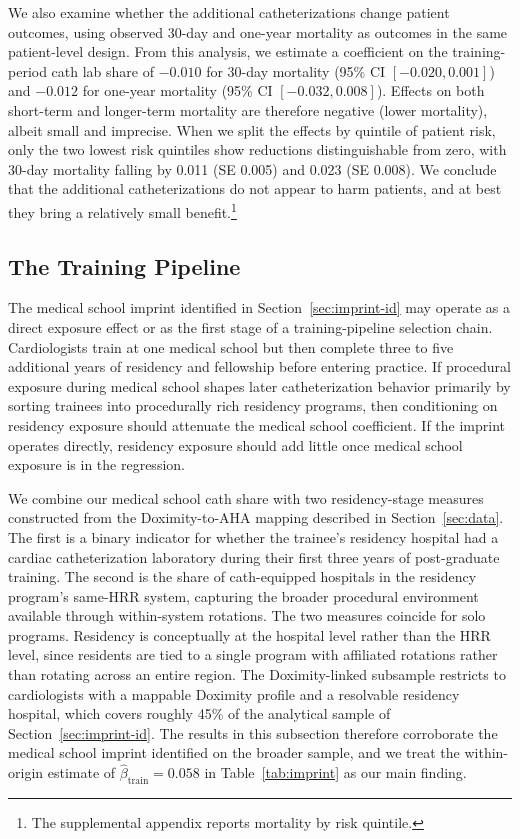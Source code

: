 \documentclass[12pt]{article}
\begin{document}
We also examine whether the additional catheterizations change patient outcomes, using observed 30-day and one-year mortality as outcomes in the same patient-level design. From this analysis, we estimate a coefficient on the training-period cath lab share of $-0.010$ for 30-day mortality (95\% CI $[-0.020, 0.001]$) and $-0.012$ for one-year mortality (95\% CI $[-0.032, 0.008]$). Effects on both short-term and longer-term mortality are therefore negative (lower mortality), albeit small and imprecise. When we split the effects by quintile of patient risk, only the two lowest risk quintiles show reductions distinguishable from zero, with 30-day mortality falling by 0.011 (SE 0.005) and 0.023 (SE 0.008). We conclude that the additional catheterizations do not appear to harm patients, and at best they bring a relatively small benefit.\footnote{The supplemental appendix reports mortality by risk quintile.}

\subsection{The Training Pipeline}\label{sec:training-pipeline}

The medical school imprint identified in Section~\ref{sec:imprint-id} may operate as a direct exposure effect or as the first stage of a training-pipeline selection chain. Cardiologists train at one medical school but then complete three to five additional years of residency and fellowship before entering practice. If procedural exposure during medical school shapes later catheterization behavior primarily by sorting trainees into procedurally rich residency programs, then conditioning on residency exposure should attenuate the medical school coefficient. If the imprint operates directly, residency exposure should add little once medical school exposure is in the regression.

We combine our medical school cath share with two residency-stage measures constructed from the Doximity-to-AHA mapping described in Section~\ref{sec:data}. The first is a binary indicator for whether the trainee's residency hospital had a cardiac catheterization laboratory during their first three years of post-graduate training. The second is the share of cath-equipped hospitals in the residency program's same-HRR system, capturing the broader procedural environment available through within-system rotations. The two measures coincide for solo programs. Residency is conceptually at the hospital level rather than the HRR level, since residents are tied to a single program with affiliated rotations rather than rotating across an entire region. The Doximity-linked subsample restricts to cardiologists with a mappable Doximity profile and a resolvable residency hospital, which covers roughly 45\% of the analytical sample of Section~\ref{sec:imprint-id}. The results in this subsection therefore corroborate the medical school imprint identified on the broader sample, and we treat the within-origin estimate of $\hat\beta_{\text{train}} = 0.058$ in Table~\ref{tab:imprint} as our main finding.
\end{document}
